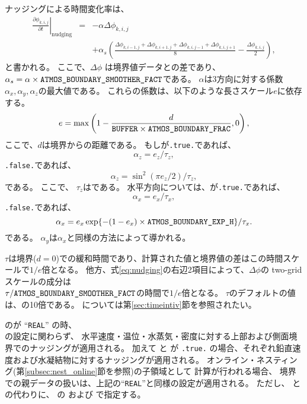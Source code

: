 ナッジングによる時間変化率は、
\begin{eqnarray}
  \left.\frac{\partial \phi_{k,i,j}}{\partial t}\right|_\mathrm{nudging}
  & = & - \alpha \Delta\phi_{k,i,j} \\ \nonumber
  && + \alpha_s \left( \frac{\Delta\phi_{k,i-1,j} + \Delta\phi_{k,i+1,j} + \Delta\phi_{k,i,j-1} + \Delta\phi_{k,i,j+1}}{8} - \frac{\Delta\phi_{k,i,j}}{2} \right),
\label{eq:nudging}
\end{eqnarray}
と書かれる。
ここで、$\Delta\phi$ は境界値データとの差であり、
$\alpha_s = \alpha \times \nmitemeq{ATMOS_BOUNDARY_SMOOTHER_FACT}$である。
$\alpha$は3方向に対する係数$\alpha_x, \alpha_y,\alpha_z$の最大値である。
これらの係数は、以下のような長さスケール$e$に依存する。
\begin{equation}
  e = \max\left( 1 - \frac{d}{\texttt{BUFFER} \times \nmitemeq{ATMOS_BOUNDARY_FRAC}}, 0 \right),
\end{equation}
ここで、$d$は境界からの距離である。
もしが\verb|.true.|であれば、
\begin{equation}
  \alpha_z = e_z / \tau_z,
\end{equation}
\verb|.false.|であれば、
\begin{equation}
  \alpha_z =  \sin^2(\pi e_z/2) / \tau_z,
\end{equation}
である。
ここで、 $\tau_z$はである。
水平方向については、が\verb|.true.|であれば、
\begin{equation}
  \alpha_x = e_x / \tau_x,
\end{equation}
\verb|.false.|であれば、
\begin{equation}
  \alpha_x = e_x \exp\{ - (1-e_x) \times \nmitemeq{ATMOS_BOUNDARY_EXP_H} \} / \tau_x.
\end{equation}
である。
$\alpha_y$は$\alpha_x$と同様の方法によって導かれる。

$\tau$は境界($d=0$)での緩和時間であり、計算された値と境界値の差はこの時間スケールで$1/e$倍となる。
他方、式\ref{eq:nudging}の右辺2項目によって、$\Delta \phi$の two-grid スケールの成分は\\ $\tau/\nmitemeq{ATMOS_BOUNDARY_SMOOTHER_FACT}$の時間で$1/e$倍となる。
$\tau$のデフォルトの値は、の10倍である。
については第\ref{sec:timeintiv}節を参照されたい。


のが ``\verb|REAL|'' の時、\\
の設定に関わらず、
水平速度・温位・水蒸気・密度に対する上部および側面境界でのナッジングが適用される。
加えて  と  が \verb|.true.| の場合、それぞれ鉛直速度および水凝結物に対するナッジングが適用される。
オンライン・ネスティング(第\ref{subsec:nest_online}節を参照)の子領域として
計算が行われる場合、
境界での親データの扱いは、上記の``\verb|REAL|''と同様の設定が適用される。
ただし、 と の代わりに、
 の  および  で指定する。


